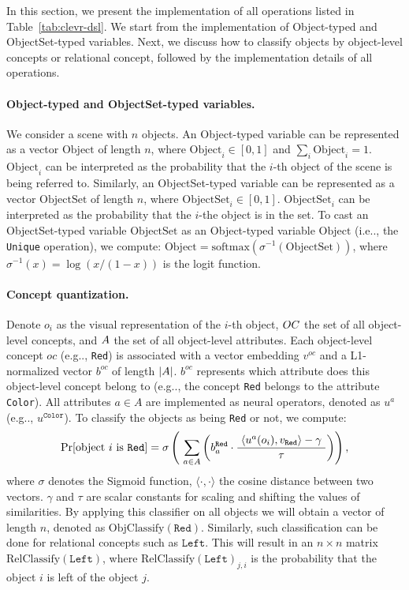 \documentclass{article} %
\makeatletter
\newcommand{\sigmoid}{\sigma}
\newcommand{\tbl}[1]{Table~\ref{#1}}
\DeclareRobustCommand\onedot{\futurelet\@let@token\@onedot}
\def\@onedot{\ifx\@let@token.\else.\null\fi\xspace}
\def\eg{e.g\onedot} \def\Eg{E.g\onedot}
\def\ie{i.e\onedot} \def\Ie{I.e\onedot}
\makeatother
\begin{document}
In this section, we present the implementation of all operations listed in \tbl{tab:clevr-dsl}. We start from the implementation of Object-typed and ObjectSet-typed variables. Next, we discuss how to classify objects by object-level concepts or relational concept, followed by the implementation details of all operations.

\paragraph{Object-typed and ObjectSet-typed variables.} We consider a scene with $n$ objects. An Object-typed variable can be represented as a vector $\mathrm{Object}$ of length $n$, where $\mathrm{Object}_{i} \in [0, 1]$ and $\sum_i \mathrm{Object}_i = 1$. $\mathrm{Object}_i$ can be interpreted as the probability that the $i$-th object of the scene is being referred to. Similarly, an ObjectSet-typed variable can be represented as a vector $\mathrm{ObjectSet}$ of length $n$, where $\mathrm{ObjectSet}_{i} \in [0, 1]$. $\mathrm{ObjectSet}_i$ can be interpreted as the probability that the $i$-the object is in the set. To cast an ObjectSet-typed variable $\mathrm{ObjectSet}$ as an Object-typed variable $\mathrm{Object}$ (\ie, the \texttt{Unique} operation), we compute: $\mathrm{Object} = \mathrm{softmax}(\sigma^{-1}(\mathrm{ObjectSet}))$,
where $\sigma^{-1}(x) = \log(x / (1-x))$ is the logit function.

\paragraph{Concept quantization.} Denote $o_i$ as the visual representation of the $i$-th object, $\mathnormal{OC}$ the set of all object-level concepts, and $\mathnormal{A}$ the set of all object-level attributes. Each object-level concept $oc$ (\eg, \texttt{Red}) is associated with a vector embedding $v^{oc}$ and a L1-normalized vector $b^{oc}$ of length $|\mathnormal{A}|$. $b^{oc}$ represents which attribute does this object-level concept belong to (\eg, the concept \texttt{Red} belongs to the attribute \texttt{Color}). All attributes $a \in A$ are implemented as neural operators, denoted as $u^a$ (\eg, $u^{\texttt{Color}}$). To classify the objects as being \texttt{Red} or not, we compute:
\[\Pr[\text{object $i$ is \texttt{Red}}] = 
\sigmoid \left( ~\sum_{a \in A} \left( b^{\texttt{Red}}_a \cdot \frac{{~\langle u^a(o_i), v_{\texttt{Red}} \rangle - \gamma}~}{\tau} \right) \right), \]
where $\sigmoid$ denotes the Sigmoid function, $\langle \cdot, \cdot \rangle$ the cosine distance between two vectors. $\gamma$ and $\tau$ are scalar constants for scaling and shifting the values of similarities. By applying this classifier on all objects we will obtain a vector of length $n$, denoted as $\mathrm{ObjClassify}(\texttt{Red})$. Similarly, such classification can be done for relational concepts such as $\texttt{Left}$. This will result in an $n\times n$ matrix $\mathrm{RelClassify}(\texttt{Left})$, where $\mathrm{RelClassify}(\texttt{Left})_{j, i}$ is the probability that the object $i$ is left of the object $j$.
\end{document}
